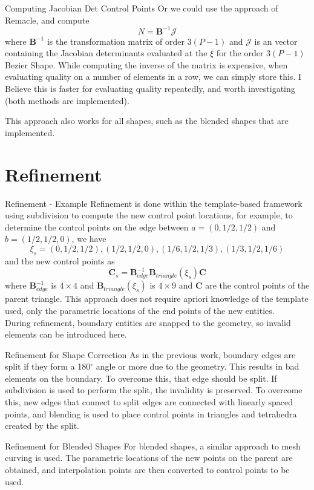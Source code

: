\documentclass[12pt]{beamer}
\newcommand{\spa}{\vspace{0.5cm}\newline}
\begin{document}
\begin{frame}{Computing Jacobian Det Control Points}
Or we could use the approach of Remacle, and compute
\[
N = \mathbf{B}^{-1}\mathcal{J}
\]
where $\mathbf{B}^{-1}$ is the transformation matrix of order $3(P-1)$ and $\mathcal{J}$ is an vector containing the Jacobian determinants evaluated at the $\xi$ for the order $3(P-1)$ Bezier Shape. While computing the inverse of the matrix is expensive, when evaluating quality on a number of elements in a row, we can simply store this. I Believe this is faster for evaluating quality repeatedly, and worth investigating (both methods are implemented). \spa

This approach also works for all shapes, such as the blended shapes that are implemented.

\end{frame}
\section{Refinement}
\begin{frame}{Refinement - Example}
Refinement is done within the template-based framework using subdivision to compute the new control point locations, for example, to determine the control points on the edge between $a = (0,1/2,1/2)$ and $b = (1/2,1/2,0)$, we have \[\xi_s = (0,1/2,1/2), (1/2,1/2,0), (1/6,1/2,1/3), (1/3,1/2,1/6) \]
and the new control points as
\[ \mathbf{C}_s = \mathbf{B}^{-1}_{edge}\mathbf{B}_{triangle}(\xi_s) \mathbf{C} \]
where $\mathbf{B}_{edge}^{-1}$ is $4 \times 4$ and $\mathbf{B}_{triangle}(\xi_s)$ is $4 \times 9$ and $\mathbf{C}$ are the control points of the parent triangle. \spa
This approach does not require apriori knowledge of the template used, only the parametric locations of the end points of the new entities. \\
During refinement, boundary entities are snapped to the geometry, so invalid elements can be introduced here.
\end{frame}
\begin{frame}{Refinement for Shape Correction}
As in the previous work, boundary edges are split if they form a 180$^\circ$ angle or more due to the geometry. This results in bad elements on the boundary. To overcome this, that edge should be split. If subdivision is used to perform the split, the invalidity is preserved. \spa To overcome this, new edges that connect to split edges are connected with linearly spaced points, and blending is used to place control points in triangles and tetrahedra created by the split.

\end{frame}
\begin{frame}{Refinement for Blended Shapes}
For blended shapes, a similar approach to mesh curving is used. The parametric locations of the new points on the parent are obtained, and interpolation points are then converted to control points to be used. 

\end{frame}
\end{document}
